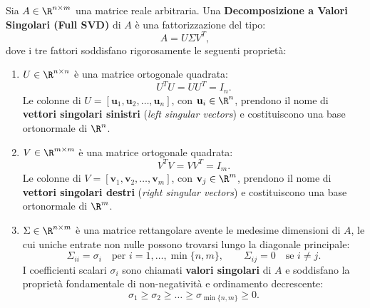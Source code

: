 \begin{definition}
\label{def:full-svd}
Sia $A \in \R^{n \times m}$ una matrice reale arbitraria. Una \textbf{Decomposizione a Valori Singolari (Full SVD)} di $A$ \`e una fattorizzazione del tipo:
\begin{equation}
    A = U \Sigma V^T,
\end{equation}
dove i tre fattori soddisfano rigorosamente le seguenti propriet\`a:
\begin{enumerate}
    \item $U \in \R^{n \times n}$ \`e una matrice ortogonale quadrata:
    \begin{equation}
        U^T U = U U^T = I_n.
    \end{equation}
    Le colonne di $U = [\mathbf{u}_1, \mathbf{u}_2, \dots, \mathbf{u}_n]$, con $\mathbf{u}_i \in \R^n$, prendono il nome di \textbf{vettori singolari sinistri} (\textit{left singular vectors}) e costituiscono una base ortonormale di $\R^n$.

    \item $V \in \R^{m \times m}$ \`e una matrice ortogonale quadrata:
    \begin{equation}
        V^T V = V V^T = I_m.
    \end{equation}
    Le colonne di $V = [\mathbf{v}_1, \mathbf{v}_2, \dots, \mathbf{v}_m]$, con $\mathbf{v}_j \in \R^m$, prendono il nome di \textbf{vettori singolari destri} (\textit{right singular vectors}) e costituiscono una base ortonormale di $\R^m$.

    \item $\Sigma \in \R^{n \times m}$ \`e una matrice rettangolare avente le medesime dimensioni di $A$, le cui uniche entrate non nulle possono trovarsi lungo la diagonale principale:
    \begin{equation}
        \Sigma_{ii} = \sigma_i \quad \text{per } i = 1, \dots, \min\{n, m\}, \qquad \Sigma_{ij} = 0 \quad \text{se } i \neq j.
    \end{equation}
    I coefficienti scalari $\sigma_i$ sono chiamati \textbf{valori singolari} di $A$ e soddisfano la propriet\`a fondamentale di non-negativit\`a e ordinamento decrescente:
    \begin{equation}
        \sigma_1 \ge \sigma_2 \ge \dots \ge \sigma_{\min\{n, m\}} \ge 0.
    \end{equation}
\end{enumerate}
\end{definition}

